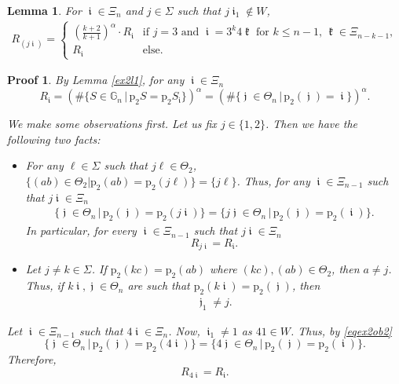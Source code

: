 \documentclass[10pt,a4paper]{amsart}
\newtheorem{lemma}{Lemma}
\newtheorem{Proof}{Proof}
\DeclareMathOperator{\iii}{\mathfrak{i}}
\DeclareMathOperator{\jjj}{\mathfrak{j}}
\DeclareMathOperator{\kkk}{\mathfrak{k}}
\begin{document}
\begin{lemma} \label{ex2l2}
For $\iii \in \Xi_n$ and $j \in \Sigma$ such that $j\iii_1 \notin W$,
\begin{align*}
R_{(j \iii)} = \begin{cases}(\frac{k+2}{k+1})^\alpha \cdot R_{\iii}& \text{if } j = 3 \text{ and } \iii = 3^k4\kkk \text{ for } k \leq n-1,\, \kkk \in \Xi_{n-k-1}, \\ 
R_{\iii} & \text{else}. \end{cases}
\end{align*}
\end{lemma}

\begin{Proof}

By Lemma \ref{ex2l1}, for any $\iii \in \Xi_n$
\[ R_{\iii} = (\#\{S\in\mathbb{G}_n\, \big|\, \mathrm{p}_{2} S = \mathrm{p}_2 S_{\iii}\})^\alpha = (\#\{\jjj \in \Theta_n\, \big|\, \mathrm{p}_{2}(\jjj) = \iii\})^\alpha. \]

We make some observations first. 
Let us fix $j \in \{1,2\}$. Then we have the following two facts:
\begin{itemize}
\item For any $\ell \in \Sigma$ such that $j\ell \in \Theta_2$, $\{(ab)\in \Theta_2| \mathrm{p}_2(ab) = \mathrm{p}_2(j\ell) \} = \{j\ell\}$. Thus, for any $\iii \in \Xi_{n-1}$ such that $j\iii \in \Xi_n$
\begin{align} \label{eqex2ob1}
\big\{\jjj \in \Theta_{n}\, \big|\, \mathrm{p}_2(\jjj) = \mathrm{p}_2(j\iii)\big\} = \big\{j\jjj \in \Theta_{n}\, \big|\, \mathrm{p}_2(\jjj) = \mathrm{p}_2(\iii)\big\}.
\end{align}
In particular, for every $\iii\in\Xi_{n-1}$ such that $j\iii\in\Xi_n$
\[R_{j\iii} = R_{\iii}.\]
\item Let $j \neq k\in\Sigma$. If $\mathrm{p}_2(kc) = \mathrm{p}_2(ab)$ where $(kc), (ab) \in \Theta_2$, then $a \neq j$. Thus, if $k\iii, \jjj \in \Theta_n$ are such that $\mathrm{p}_2(k\iii) = \mathrm{p}_2(\jjj)$, then
\begin{align}\label{eqex2ob2}
\jjj_1 \neq j.
\end{align}
\end{itemize}

Let $\iii \in \Xi_{n-1}$ such that $4\iii \in \Xi_n$. Now, $\iii_1 \neq 1$ as $41 \in W$. Thus, by \eqref{eqex2ob2}
\[
\big\{\jjj \in \Theta_{n}\, \big|\, \mathrm{p}_2(\jjj) = \mathrm{p}_2(4\iii)\big\} = \big\{4\jjj \in \Theta_{n}\, \big|\, \mathrm{p}_2(\jjj) = \mathrm{p}_2(\iii)\big\}.
\]
Therefore,
\[R_{4\iii} = R_{\iii}.\]


\end{Proof}
\end{document}

